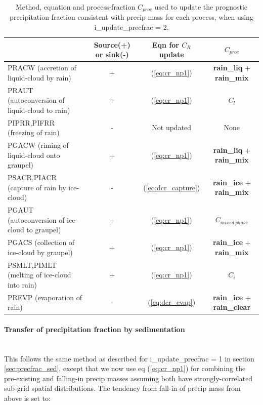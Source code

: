 \documentclass{UMDP_article}
\begin{document}
\begin{table}[ht!]
\begin{center}
\begin{tabular}{|p{4cm}|c|c|c|}
\hline
 &  Source(+) or sink(-) & Eqn for $C_R$ update &
{\bf $C_{proc}$} \\
\hline
PRACW (accretion of liquid-cloud by rain)      & + & (\ref{eq:cr_np1}) &
{\bf rain\_liq} + {\bf rain\_mix} \\
\hline
PRAUT (autoconversion of liquid-cloud to rain) & + & (\ref{eq:cr_np1}) &
$C_l$ \\
\hline
PIPRR,PIFRR (freezing of rain)                 & - & Not updated &
None \\
\hline
PGACW (riming of liquid-cloud onto graupel)    & + & (\ref{eq:cr_np1}) &
{\bf rain\_liq} + {\bf rain\_mix} \\
\hline
PSACR,PIACR (capture of rain by ice-cloud)     & - & (\ref{eq:dcr_capture}) &
{\bf rain\_ice} + {\bf rain\_mix} \\
\hline
PGAUT (autoconversion of ice-cloud to graupel) & + & (\ref{eq:cr_np1}) &
$C_{mixed~phase}$ \\
\hline
PGACS (collection of ice-cloud by graupel)     & + & (\ref{eq:cr_np1}) &
{\bf rain\_ice} + {\bf rain\_mix} \\
\hline
PSMLT,PIMLT (melting of ice-cloud into rain)   & + & (\ref{eq:cr_np1}) &
$C_i$ \\
\hline
PREVP (evaporation of rain)                    & - & (\ref{eq:dcr_evap}) &
{\bf rain\_ice} + {\bf rain\_clear} \\
\hline
\end{tabular}
\end{center}
\caption{Method, equation and process-fraction $C_{proc}$ used to update the
prognostic precipitation fraction consistent with precip mass
for each process, when using i\_update\_precfrac = 2.}
\label{tab:precfrac_processes_2}
\end{table}

\paragraph{Transfer of precipitation fraction by sedimentation}
~\\

This follows the same method as described for i\_update\_precfrac = 1
in section \ref{sec:precfrac_sed},
except that we now use eq (\ref{eq:cr_np1}) for combining the pre-existing
and falling-in precip masses assuming both have strongly-correlated
sub-grid spatial distributions.
The tendency from fall-in of precip mass from above is set to:
\end{document}
